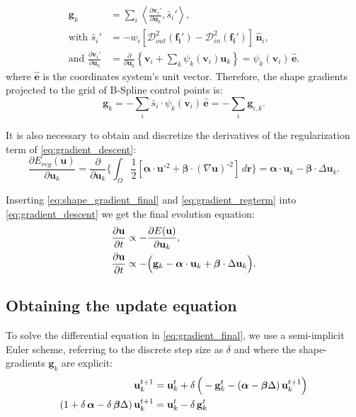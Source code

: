 \documentclass[a4paper]{report}
\providecommand{\mdist}[2]{ \mathcal{D}_{#2}^2(\mathbf{#1}) }
\renewcommand{\vec}[1]{\mathbf{#1}}
\begin{document}
  \begin{align}
  \vec{g}_k &= \underset{i}{\sum} \left\langle \frac{\partial \vec{v}_i'}{\partial \vec{u}_k}, \bar{s}_i'\right\rangle, \\
  \text{with }
  \bar{s}_i' &= - w_i \left[ \mdist{f_i'}{out} - \mdist{f_i'}{in} \right] \, \hat{\vec{n}}_i, \\
  \text{and } 
  \frac{\partial \vec{v}_i'}{\partial \vec{u}_k} &=
  \frac{\partial}{\partial \vec{u}_k} \left\{ \vec{v}_i + \sum_k \psi_k(\vec{v}_i) \vec{u}_k \right\} = \psi_k(\vec{v}_i)\, \hat{\vec{e}}.
  \label{eq:gradient_wshape}
  \end{align}%
  where $\hat{\vec{e}}$ is the coordinates system's unit vector.
Therefore, the shape gradients projected to the grid of B-Spline control points is:
\begin{equation}
  \vec{g}_k = - \underset{i}{\sum} \bar{s}_i \cdot \psi_k(\vec{v}_i) \, \hat{\vec{e}} = - \underset{i}{\sum} \vec{g}_{i,k}.
  \label{eq:shape_gradient_final}
\end{equation}

It is also necessary to obtain and discretize the derivatives of the regularization term of \eqref{eq:gradient_descent}:
  \begin{equation}
  \frac{\partial E_{reg}(\vec{u})}{\partial \vec{u}_k} = \frac{ \partial }{\partial \vec{u}_k} \Big\{
  \int_{\Omega} \frac12 [ \boldsymbol{\alpha} \cdot \vec{u}^{\circ2}
  + \boldsymbol{\beta} \cdot (\nabla \vec{u})^{\circ2} ] \,d\vec{r}
  \Big\} = \boldsymbol{\alpha} \cdot \vec{u}_k - \boldsymbol{\beta} \cdot \Delta \vec{u}_k.
  \label{eq:gradient_regterm}
  \end{equation}

Inserting \eqref{eq:shape_gradient_final} and \eqref{eq:gradient_regterm} into \eqref{eq:gradient_descent} we get the
  final evolution equation:
  \begin{align}
  \frac{\partial \vec{u}}{\partial t} &\propto - \frac{\partial E(\vec{u})}{\partial \vec{u}_k}, \notag\\
  \frac{\partial \vec{u}}{\partial t} &\propto - \Big( \vec{g}_k - \boldsymbol{\alpha} \cdot \vec{u}_k + \boldsymbol{\beta} \cdot \Delta \vec{u}_k \Big).
  \label{eq:gradient_final}
  \end{align}


\subsection{Obtaining the update equation} To solve the differential equation in \eqref{eq:gradient_final},
  we use a semi-implicit Euler scheme, referring to the discrete step size as $\delta$ and where the
  shape-gradients $\vec{g}_k$ are explicit:
\begin{align}
  \vec{u}_k^{t+1} &= \vec{u}_k^{t} + \delta \, \Big( - \vec{g}_k^{t} - ( \boldsymbol{\alpha} - \boldsymbol{\beta} \Delta) \, \vec{u}_k^{t+1} \Big) \notag \\
  (1 + \delta \, \boldsymbol{\alpha} - \delta \, \boldsymbol{\beta} \Delta)\, \vec{u}_k^{t+1} &= \vec{u}_k^{t} - \delta\, \vec{g}_k^{t}
  \label{eq:discrete_derivative}
\end{align}
\end{document}
